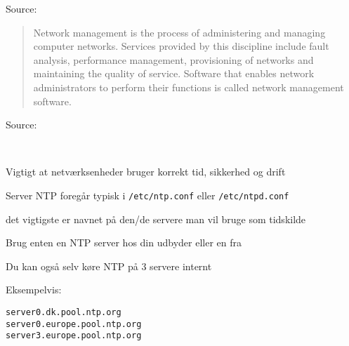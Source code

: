 \documentclass[Screen16to9,17pt]{foils}
\begin{document}



Source:\\{\footnotesize
{}}






\begin{quote}
Network management is the process of administering and managing computer networks. Services provided by this discipline include fault analysis, performance management, provisioning of networks and maintaining the quality of service. Software that enables network administrators to perform their functions is called network management software.\\
\end{quote}

Source:\\{\footnotesize
{}}



{~}

\begin{list1}
\item Vigtigt at netværksenheder bruger korrekt tid, sikkerhed og drift
\item Server NTP foregår typisk i \verb+/etc/ntp.conf+ eller \verb+/etc/ntpd.conf+
\item det vigtigste er navnet på den/de servere man vil bruge som tidskilde
\item Brug enten en NTP server hos din udbyder eller en fra 
\item Du kan også selv køre NTP på 3 servere internt
\item Eksempelvis:
\end{list1}

\begin{alltt}
server 0.dk.pool.ntp.org
server 0.europe.pool.ntp.org
server 3.europe.pool.ntp.org

\end{alltt}

\end{document}
